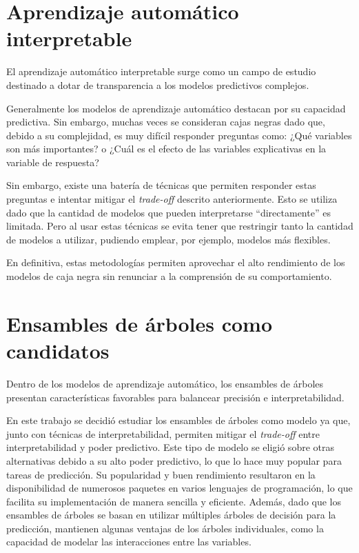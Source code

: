\section{Aprendizaje automático interpretable}

El aprendizaje automático interpretable surge como un campo de estudio destinado a dotar de transparencia a los modelos predictivos complejos.

Generalmente los modelos de aprendizaje automático destacan por su capacidad predictiva. Sin embargo, muchas veces se consideran cajas negras dado que, debido a su complejidad, es muy difícil responder preguntas como: ¿Qué variables son más importantes? o ¿Cuál es el efecto de las variables explicativas en la variable de respuesta?

Sin embargo, existe una batería de técnicas que permiten responder estas preguntas e intentar mitigar el \textit{trade-off} descrito anteriormente. Esto se utiliza dado que la cantidad de modelos que pueden interpretarse ``directamente'' es limitada. Pero al usar estas técnicas se evita tener que restringir tanto la cantidad de modelos a utilizar, pudiendo emplear, por ejemplo, modelos más flexibles.

En definitiva, estas metodologías permiten aprovechar el alto rendimiento de los modelos de caja negra sin renunciar a la comprensión de su comportamiento.

\section{Ensambles de árboles como candidatos}

Dentro de los modelos de aprendizaje automático, los ensambles de árboles presentan características favorables para balancear precisión e interpretabilidad.

En este trabajo se decidió estudiar los ensambles de árboles como modelo ya que, junto con técnicas de interpretabilidad, permiten mitigar el \textit{trade-off} entre interpretabilidad y poder predictivo. Este tipo de modelo se eligió sobre otras alternativas debido a su alto poder predictivo, lo que lo hace muy popular para tareas de predicción. Su popularidad y buen rendimiento resultaron en la disponibilidad de numerosos paquetes en varios lenguajes de programación, lo que facilita su implementación de manera sencilla y eficiente. Además, dado que los ensambles de árboles se basan en utilizar múltiples árboles de decisión para la predicción, mantienen algunas ventajas de los árboles individuales, como la capacidad de modelar las interacciones entre las variables.

